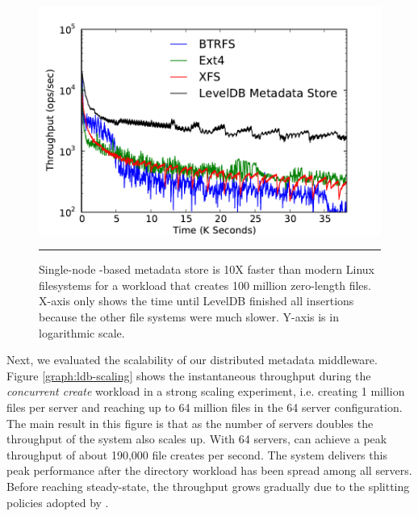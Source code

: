 \begin{figure}[t]  %
\centerline{\includegraphics[scale=0.45]{./figs/ldb_insertrate_onenode}}
\caption{
{\small 
Single-node \ldb{}-based metadata store is 10X faster than modern Linux
filesystems for a workload that creates 100 million zero-length files.
X-axis only shows the time until LevelDB finished all insertions because the other 
file systems were much slower. Y-axis is in logarithmic scale.
}
}
\vspace{15pt}
\hrule 
\label{graph:ldb-singlenode}
\end{figure}       %


Next, we evaluated the scalability of our distributed metadata middleware.
Figure \ref{graph:ldb-scaling} shows the instantaneous throughput during the 
\textit{concurrent create} workload in a strong scaling experiment, i.e.
creating 1 million files per server and reaching up to 64 million files in the
64 server configuration.
The main result in this figure is that as the number of servers doubles the
throughput of the system also scales up. With 64 servers, \giga{} can achieve a
peak throughput of about 190,000 file creates per second. The system delivers
this peak performance after the directory workload has been spread among all
servers.
Before reaching steady-state, the throughput grows gradually due to the splitting
policies adopted by \giga{}.
 
